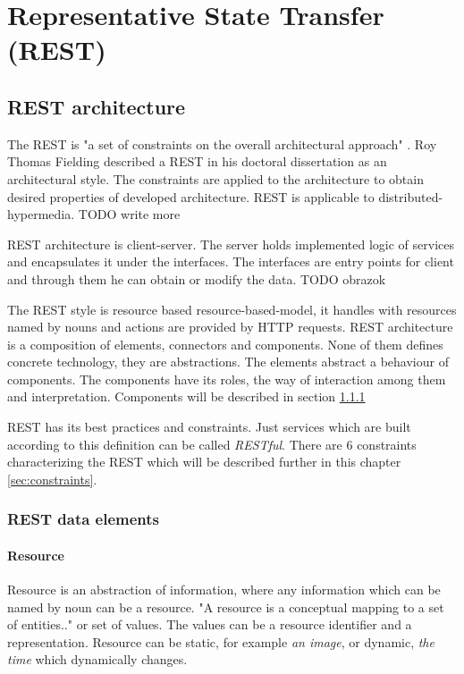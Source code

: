 \chapter{Representative State Transfer (REST)}
\label{chap:rest}

\section{REST architecture}
\label{sec:rest-architecture}

The REST is "a set of constraints on the overall architectural approach" \cite{agile-architecture}. Roy Thomas Fielding described a REST in his doctoral dissertation as an architectural style. The constraints are applied to the architecture to obtain desired properties of developed architecture. REST is applicable to \gls{distributed-hypermedia}. TODO write more

REST architecture is client-server. The server holds implemented logic of services and encapsulates it under the interfaces. The interfaces are entry points for client and through them he can obtain or modify the data. TODO obrazok

The REST style is resource based \gls{resource-based-model}, it handles with resources named by nouns and actions are provided by HTTP requests. 
REST architecture is a composition of elements, connectors and components. None of them defines concrete technology, they are abstractions. The elements abstract a behaviour of components. The components have its roles, the way of interaction among them and interpretation. Components will be described in section \ref{sec:data-elements}

REST has its best practices and constraints. Just services which are built according to this definition can be called \emph{RESTful}. There are 6 constraints characterizing the REST which will be described further in this chapter \ref{sec:constraints}.

\subsection{REST data elements}
\label{sec:data-elements}

\subsubsection{Resource}
  Resource is an abstraction of information, where any information which can be named by noun can be a resource. "A resource is a conceptual mapping to a set of entities.." \cite{fielding} or set of values. The values can be a resource identifier and a representation.
  Resource can be static, for example \emph{an image}, or dynamic, \emph{the time} which dynamically changes.
  
